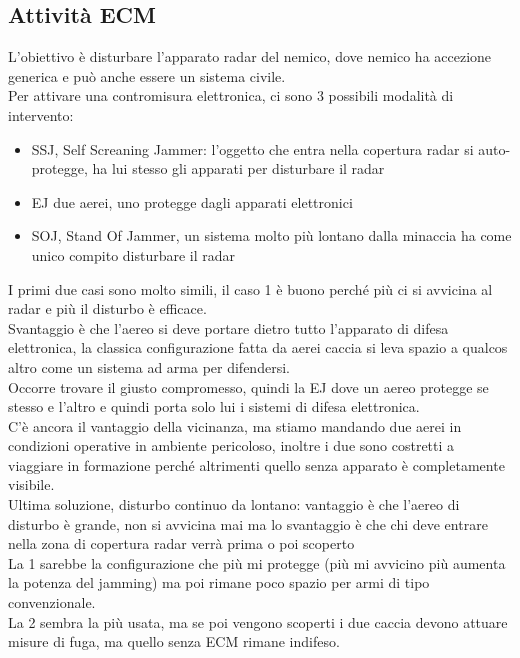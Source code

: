 \documentclass[oneside, 12pt]{extbook}
\begin{document}
\subsection{Attività ECM}
L'obiettivo è disturbare l'apparato radar del nemico, dove nemico ha accezione generica e può anche essere un sistema civile.\\
Per attivare una contromisura elettronica, ci sono 3 possibili modalità di intervento:
\begin{itemize}
	\item SSJ, Self Screaning Jammer: l'oggetto che entra nella copertura radar si auto-protegge, ha lui stesso gli apparati per disturbare il radar
	\item EJ due aerei, uno protegge dagli apparati elettronici
	\item SOJ, Stand Of Jammer, un sistema molto più lontano dalla minaccia ha come unico compito disturbare il radar
\end{itemize}
I primi due casi sono molto simili, il caso 1 è buono perché più ci si avvicina al radar e più il disturbo è efficace.\\
Svantaggio è che l'aereo si deve portare dietro tutto l'apparato di difesa elettronica, la classica configurazione fatta da aerei caccia si leva spazio a qualcos altro come un sistema ad arma per difendersi.\\
Occorre trovare il giusto compromesso, quindi la EJ dove un aereo protegge se stesso e l'altro e quindi porta solo lui i sistemi di difesa elettronica.\\
C'è ancora il vantaggio della vicinanza, ma stiamo mandando due aerei in condizioni operative in ambiente pericoloso, inoltre i due sono costretti a viaggiare in formazione perché altrimenti quello senza apparato è completamente visibile.\\
Ultima soluzione, disturbo continuo da lontano: vantaggio è che l'aereo di disturbo è grande, non si avvicina mai ma lo svantaggio è che chi deve entrare nella zona di copertura radar verrà prima o poi scoperto\\
La 1 sarebbe la configurazione che più mi protegge (più mi avvicino più aumenta la potenza del jamming) ma poi rimane poco spazio per armi di tipo convenzionale.\\
La 2 sembra la più usata, ma se poi vengono scoperti i due caccia devono attuare misure di fuga, ma quello senza ECM rimane indifeso.
\end{document}
